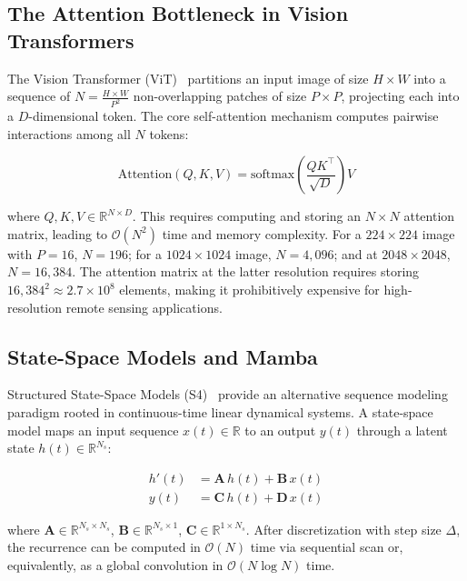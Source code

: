 \documentclass[conference]{IEEEtran}
\begin{document}
\subsection{The Attention Bottleneck in Vision Transformers}

The Vision Transformer (ViT)~\cite{dosovitskiy2020image} partitions an input image of size $H \times W$ into a sequence of $N = \frac{H \times W}{P^2}$ non-overlapping patches of size $P \times P$, projecting each into a $D$-dimensional token. The core self-attention mechanism computes pairwise interactions among all $N$ tokens:

\begin{equation}
\text{Attention}(Q, K, V) = \text{softmax}\!\left(\frac{QK^\top}{\sqrt{D}}\right) V
\label{eq:attention}
\end{equation}

\noindent where $Q, K, V \in \mathbb{R}^{N \times D}$. This requires computing and storing an $N \times N$ attention matrix, leading to $\mathcal{O}(N^2)$ time and memory complexity. For a $224 \times 224$ image with $P=16$, $N = 196$; for a $1024 \times 1024$ image, $N = 4{,}096$; and at $2048 \times 2048$, $N = 16{,}384$. The attention matrix at the latter resolution requires storing $16{,}384^2 \approx 2.7 \times 10^8$ elements, making it prohibitively expensive for high-resolution remote sensing applications.

\subsection{State-Space Models and Mamba}

Structured State-Space Models (S4)~\cite{gu2021efficiently} provide an alternative sequence modeling paradigm rooted in continuous-time linear dynamical systems. A state-space model maps an input sequence $x(t) \in \mathbb{R}$ to an output $y(t)$ through a latent state $h(t) \in \mathbb{R}^{N_s}$:

\begin{align}
h'(t) &= \mathbf{A}\, h(t) + \mathbf{B}\, x(t) \label{eq:ssm_ct1}\\
y(t) &= \mathbf{C}\, h(t) + \mathbf{D}\, x(t) \label{eq:ssm_ct2}
\end{align}

\noindent where $\mathbf{A} \in \mathbb{R}^{N_s \times N_s}$, $\mathbf{B} \in \mathbb{R}^{N_s \times 1}$, $\mathbf{C} \in \mathbb{R}^{1 \times N_s}$. After discretization with step size $\Delta$, the recurrence can be computed in $\mathcal{O}(N)$ time via sequential scan or, equivalently, as a global convolution in $\mathcal{O}(N \log N)$ time.
\end{document}
